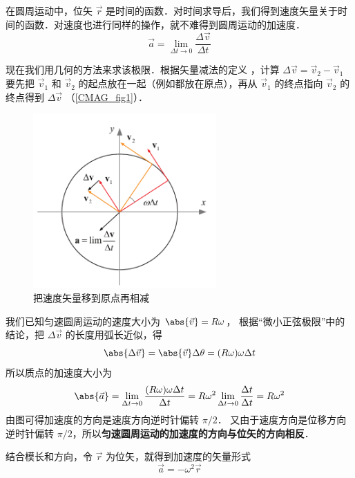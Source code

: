 

在圆周运动中，位矢 $\vec r$ 是时间的函数．对时间求导后，我们得到速度矢量关于时间的函数．对速度也进行同样的操作，就不难得到圆周运动的加速度．
\begin{equation}
\vec a = \mathop {\lim }\limits_{\Delta t \to 0} \frac{\Delta \vec v}{\Delta t}
\end{equation}

现在我们用几何的方法来求该极限．根据矢量减法的定义%
，计算 $\Delta \vec v = {\vec v_2} - {\vec v_1}$ 要先把 ${\vec v_1}$ 和 ${\vec v_2}$ 的起点放在一起（例如都放在原点），再从 ${\vec v_1}$ 的终点指向 ${\vec v_2}$ 的终点得到 $\Delta \vec v$ （\autoref{CMAG_fig1}）． 

\begin{figure}[ht]
\centering
\includegraphics[width=7cm]{./figures/CMAG.pdf}
\caption{把速度矢量移到原点再相减}\label{CMAG_fig1}
\end{figure}

我们已知匀速圆周运动的速度大小为 $\abs{\vec v} = R\omega$， 根据“微小正弦极限”中的结论，把 $\Delta\vec v$ 的长度用弧长近似，得
\begin{equation}
\abs{\Delta \vec v} = \abs{\vec v}\Delta \theta  = (R\omega)\omega \Delta t
\end{equation}
所以质点的加速度大小为
\begin{equation}
\abs{\vec a} = \lim_{\Delta t \to 0} \frac{(R\omega)\omega \Delta t}{\Delta t} = R{\omega ^2}\lim_{\Delta t \to 0} \frac{\Delta t}{\Delta t} = R{\omega ^2}
\end{equation}
由图可得加速度的方向是速度方向逆时针偏转 $\pi/{2}$． 又由于速度方向是位移方向逆时针偏转 $\pi/2$，所以\textbf{匀速圆周运动的加速度的方向与位矢的方向相反}．

结合模长和方向，令 $\vec r$ 为位矢，就得到加速度的矢量形式
\begin{equation}
\vec a =  - {\omega ^2}\vec r
\end{equation}


















